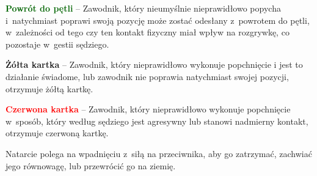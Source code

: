 \documentclass[12pt,a4paper]{article}
\renewcommand{\paragraph}[1]{
  \oldparagraph{#1}%
  \leftskip2.8cm
}
\newcommand\redcard[1]{\bgroup\textcolor{red}{\textbf{#1}}}
\newcommand\yellowcard[1]{\bgroup\textcolor{darkyellow}{\textbf{#1}}}
\newcommand\other[1]{\bgroup\textcolor{darkgreen}{\textbf{#1}}}
\begin{document}
\other{Powrót do pętli} -- Zawodnik, który nieumyślnie nieprawidłowo
popycha i~natychmiast poprawi swoją pozycję może zostać odesłany z~powrotem do pętli, w~zależności od tego czy ten kontakt fizyczny miał
wpływ na rozgrywkę, co pozostaje w~gestii sędziego.

\yellowcard{Żółta kartka} -- Zawodnik, który nieprawidłowo wykonuje popchnięcie
i jest to działanie świadome, lub zawodnik nie poprawia natychmiast
swojej pozycji, otrzymuje żółtą kartkę.

\redcard{Czerwona kartka} -- Zawodnik, który nieprawidłowo wykonuje
popchnięcie w~sposób, który według sędziego jest agresywny lub stanowi
nadmierny kontakt, otrzymuje czerwoną kartkę.

\paragraph{Natarcie}
Natarcie polega na wpadnięciu z~siłą na
przeciwnika, aby go zatrzymać, zachwiać jego równowagę, lub przewrócić
go na ziemię.
\end{document}
